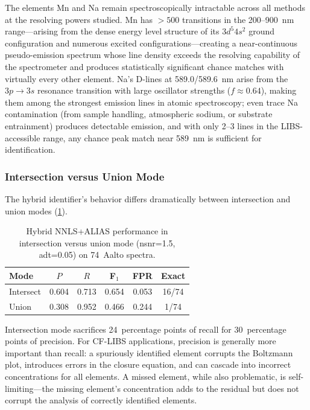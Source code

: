 The elements Mn and Na remain spectroscopically intractable across all methods at the resolving powers studied.
Mn has $> 500$ transitions in the 200--900~nm range---arising from the dense energy level structure of its $3d^5 4s^2$ ground configuration and numerous excited configurations---creating a near-continuous pseudo-emission spectrum whose line density exceeds the resolving capability of the spectrometer and produces statistically significant chance matches with virtually every other element.
Na's D-lines at 589.0/589.6~nm arise from the $3p \to 3s$ resonance transition with large oscillator strengths ($f \approx 0.64$), making them among the strongest emission lines in atomic spectroscopy; even trace Na contamination (from sample handling, atmospheric sodium, or substrate entrainment) produces detectable emission, and with only 2--3 lines in the LIBS-accessible range, any chance peak match near 589~nm is sufficient for identification.

\subsubsection{Intersection versus Union Mode}
\label{sec:results-intersect-union}

The hybrid identifier's behavior differs dramatically between intersection and union modes (\cref{tab:intersect-union}).

\begin{table}[t]
  \centering
  \caption{Hybrid NNLS+ALIAS performance in intersection versus union mode (nsnr=1.5, adt=0.05) on 74~Aalto spectra.}
  \label{tab:intersect-union}
  \begin{tabular}{lccccc}
    \toprule
    Mode & $P$ & $R$ & F$_1$ & FPR & Exact \\
    \midrule
    Intersect & 0.604 & 0.713 & 0.654 & 0.053 & 16/74 \\
    Union     & 0.308 & 0.952 & 0.466 & 0.244 & 1/74 \\
    \bottomrule
  \end{tabular}
\end{table}

Intersection mode sacrifices 24~percentage points of recall for 30~percentage points of precision.
For CF-LIBS applications, precision is generally more important than recall: a spuriously identified element corrupts the Boltzmann plot, introduces errors in the closure equation, and can cascade into incorrect concentrations for all elements.
A missed element, while also problematic, is self-limiting---the missing element's concentration adds to the residual but does not corrupt the analysis of correctly identified elements.

